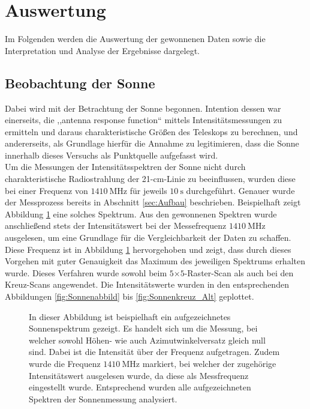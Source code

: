 \section{Auswertung}
Im Folgenden werden die Auswertung der gewonnenen Daten sowie die Interpretation und Analyse der Ergebnisse dargelegt.
    \subsection{Beobachtung der Sonne}
    Dabei wird mit der Betrachtung der Sonne begonnen.
    Intention dessen war einerseits, die ,,antenna response function`` mittels Intensitätsmessungen zu ermitteln und
    daraus charakteristische Größen des Teleskops zu berechnen, und andererseits, als Grundlage hierfür die Annahme zu legitimieren,
    dass die Sonne innerhalb dieses Versuchs als Punktquelle aufgefasst wird.\\

    Um die Messungen der Intensitätsspektren der Sonne nicht durch charakteristische Radiostrahlung der
    21-\si{\centi \metre}-Linie zu beeinflussen,
    wurden diese bei einer Frequenz von $\SI{1410}{\mega \hertz}$ für jeweils $\SI{10}{\second}$ durchgeführt.
    Genauer wurde der Messprozess bereits in Abschnitt \ref{sec:Aufbau} beschrieben. 
    Beispielhaft zeigt Abbildung \ref{fig:Sonnenspektrum} eine solches Spektrum.
    Aus den gewonnenen Spektren wurde anschließend stets der Intensitätswert bei der Messefrequenz $\SI{1410}{\mega \hertz}$ ausgelesen, um eine Grundlage für die Vergleichbarkeit der Daten zu schaffen.  
    Diese Frequenz ist in Abbildung \ref{fig:Sonnenspektrum} hervorgehoben und zeigt, dass durch dieses Vorgehen mit guter Genauigkeit das Maximum des jeweiligen Spektrums erhalten wurde. 
    Dieses Verfahren wurde sowohl beim $5$$\times$$5$-Raster-Scan als auch bei den Kreuz-Scans angewendet.
    Die Intensitätswerte wurden in den entsprechenden Abbildungen \ref{fig:Sonnenabbild} bis \ref{fig:Sonnenkreuz_Alt} geplottet. 

    \begin{figure}[ht]
        \centering
        
        \caption[Beispielspektrum der Sonnenmessungen]{In dieser Abbildung ist beispielhaft ein aufgezeichnetes Sonnenspektrum gezeigt. Es handelt sich um die Messung, bei welcher sowohl Höhen- wie auch Azimutwinkelversatz gleich null sind. Dabei ist die Intensität über der Frequenz aufgetragen. Zudem wurde die Frequenz $\SI{1410}{\mega \hertz}$ markiert, bei welcher der zugehörige Intensitätswert ausgelesen wurde, da diese als Messfrequenz eingestellt wurde. Entsprechend wurden alle aufgezeichneten Spektren der Sonnenmessung analysiert.}
        \label{fig:Sonnenspektrum}
    \end{figure}

